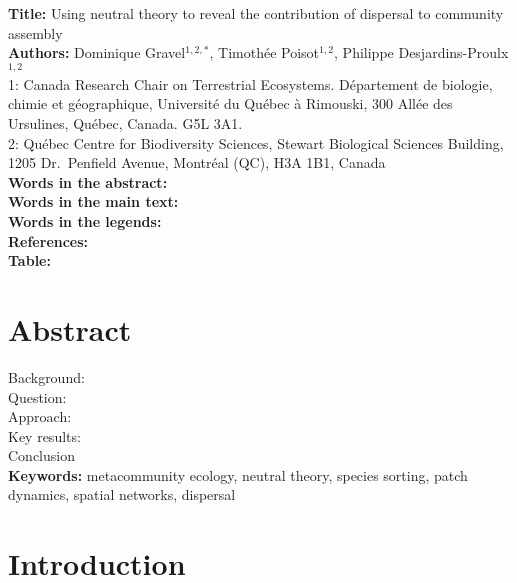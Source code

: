 \documentclass[12pt]{article}
\begin{document}
\linenumbers 
\modulolinenumbers[1]

\textbf{Title:}   Using neutral theory to reveal the contribution of dispersal to community assembly\\

\textbf{Authors:}  Dominique Gravel$^{1,2,*}$, Timoth\'ee Poisot$^{1,2}$, Philippe Desjardins-Proulx$^{1,2}$\\

1: Canada Research Chair on Terrestrial Ecosystems. D\'epartement de biologie, chimie et g\'eographique, Universit\'e du Qu\'ebec \`a Rimouski, 300 All\'ee des Ursulines, Qu\'ebec, Canada. G5L 3A1.\\

2: Qu\'ebec Centre for Biodiversity Sciences, Stewart Biological Sciences Building, 1205 Dr.~Penfield Avenue, Montr\'eal (QC), H3A 1B1, Canada\\

\textbf{Words in the abstract:}      \\
\textbf{Words in the main text:}    \\
\textbf{Words in the legends:}    \\
\textbf{References:}             \\
\textbf{Table:}                    \\

\newpage
\doublespacing


\section*{Abstract}
Background: \\
Question: \\
Approach: \\
Key results: \\
Conclusion\\

\textbf{Keywords:} metacommunity ecology, neutral theory, species
sorting, patch dynamics, spatial networks, dispersal\\

\newpage

\section{Introduction}
\end{document}
